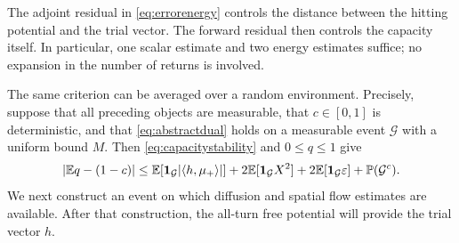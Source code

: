 The adjoint residual in \eqref{eq:errorenergy} controls the distance
between the hitting potential and the trial vector.  The forward
residual then controls the capacity itself.  In particular, one scalar
estimate and two energy estimates suffice; no expansion in the number
of returns is involved.

The same criterion can be averaged over a random environment.
Precisely, suppose that all preceding objects are measurable, that
$c\in[0,1]$ is deterministic, and that \eqref{eq:abstractdual} holds
on a measurable event $\mathcal G$ with a uniform bound $M$.
Then \eqref{eq:capacitystability} and $0\le q\le1$ give
\begin{equation}\label{eq:averagedcapacity}
 \lvert \mathbb E q-(1-c)\rvert
 \le \mathbb E\!\left[\mathbf 1_{\mathcal G}\lvert \langle h,\mu_+\rangle\rvert\right]
      +2\mathbb E[\mathbf 1_{\mathcal G}X^2]
      +2\mathbb E[\mathbf 1_{\mathcal G}\varepsilon]
      +\mathbb P(\mathcal G^c).
\end{equation}
We next construct an event on which diffusion and spatial flow
estimates are available.  After that construction, the all-turn free
potential will provide the trial vector $h$.
